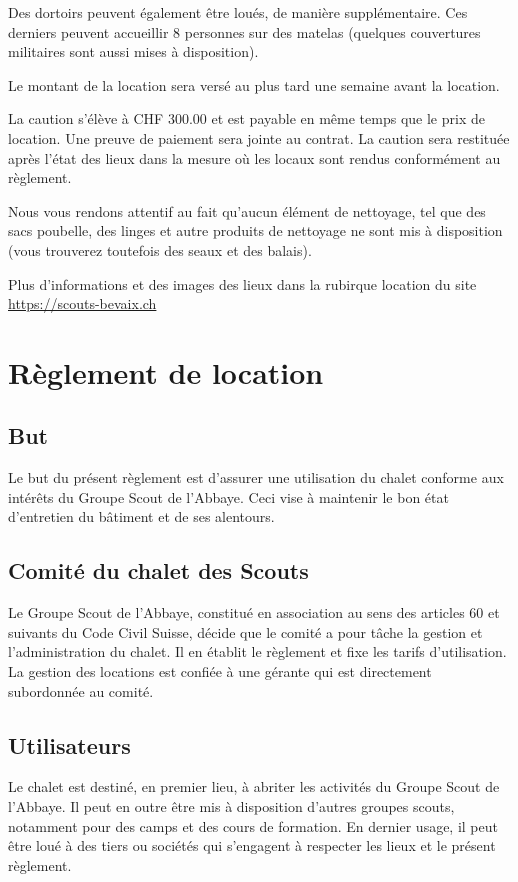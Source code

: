\documentclass[a4paper,12pt]{extarticle}
\begin{document}
Des dortoirs peuvent également être loués, de manière supplémentaire.
Ces derniers peuvent accueillir 8 personnes sur des matelas (quelques couvertures militaires sont aussi mises à disposition).

Le montant de la location sera versé au plus tard une semaine avant la location.

La caution s'élève à CHF 300.00 et est payable en même temps que le prix de location. Une preuve de paiement sera jointe au contrat. La caution sera restituée après l'état des lieux dans la mesure où les locaux sont rendus conformément au règlement. 

Nous vous rendons attentif au fait qu'aucun élément de nettoyage, tel que des sacs poubelle, des linges et autre produits de nettoyage ne sont mis à disposition (vous trouverez toutefois des seaux et des balais).

Plus d'informations et des images des lieux dans la rubirque location du site \url{https://scouts-bevaix.ch}

\newpage

\section{Règlement de location \label{sec:contract}}

\subsection{But}
Le but du présent règlement est d'assurer une utilisation du chalet conforme aux intérêts du Groupe Scout de l'Abbaye. Ceci vise à maintenir le bon état d'entretien du bâtiment et de ses alentours.

\subsection{Comité du chalet des Scouts}

Le Groupe Scout de l'Abbaye, constitué en association au sens des articles 60 et suivants du Code Civil Suisse, décide que le comité a pour tâche la gestion et l'administration du chalet. Il en établit le règlement et fixe les tarifs d'utilisation. 
La gestion des locations est confiée à une gérante qui est directement subordonnée au comité.

\subsection{Utilisateurs}
Le chalet est destiné, en premier lieu, à abriter les activités du Groupe Scout de l'Abbaye.
Il peut en outre être mis à disposition d'autres groupes scouts, notamment pour des camps et des cours de formation. En dernier usage, il peut être loué à des tiers ou sociétés qui s'engagent à respecter les lieux et le présent règlement.
\end{document}
